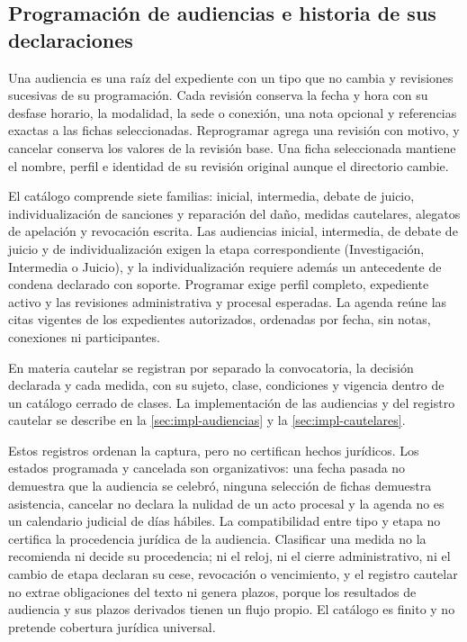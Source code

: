 \subsection{Programación de audiencias e historia de sus declaraciones}\label{sec:diseno-audiencias}

Una audiencia es una raíz del expediente con un tipo que no cambia y revisiones sucesivas de su programación. Cada revisión conserva la fecha y hora con su desfase horario, la modalidad, la sede o conexión, una nota opcional y referencias exactas a las fichas seleccionadas. Reprogramar agrega una revisión con motivo, y cancelar conserva los valores de la revisión base. Una ficha seleccionada mantiene el nombre, perfil e identidad de su revisión original aunque el directorio cambie.

El catálogo comprende siete familias: inicial, intermedia, debate de juicio, individualización de sanciones y reparación del daño, medidas cautelares, alegatos de apelación y revocación escrita. Las audiencias inicial, intermedia, de debate de juicio y de individualización exigen la etapa correspondiente (Investigación, Intermedia o Juicio), y la individualización requiere además un antecedente de condena declarado con soporte. Programar exige perfil completo, expediente activo y las revisiones administrativa y procesal esperadas. La agenda reúne las citas vigentes de los expedientes autorizados, ordenadas por fecha, sin notas, conexiones ni participantes.

En materia cautelar se registran por separado la convocatoria, la decisión declarada y cada medida, con su sujeto, clase, condiciones y vigencia dentro de un catálogo cerrado de clases. La implementación de las audiencias y del registro cautelar se describe en la \cref{sec:impl-audiencias} y la \cref{sec:impl-cautelares}.

Estos registros ordenan la captura, pero no certifican hechos jurídicos. Los estados programada y cancelada son organizativos: una fecha pasada no demuestra que la audiencia se celebró, ninguna selección de fichas demuestra asistencia, cancelar no declara la nulidad de un acto procesal y la agenda no es un calendario judicial de días hábiles. La compatibilidad entre tipo y etapa no certifica la procedencia jurídica de la audiencia. Clasificar una medida no la recomienda ni decide su procedencia; ni el reloj, ni el cierre administrativo, ni el cambio de etapa declaran su cese, revocación o vencimiento, y el registro cautelar no extrae obligaciones del texto ni genera plazos, porque los resultados de audiencia y sus plazos derivados tienen un flujo propio. El catálogo es finito y no pretende cobertura jurídica universal.

